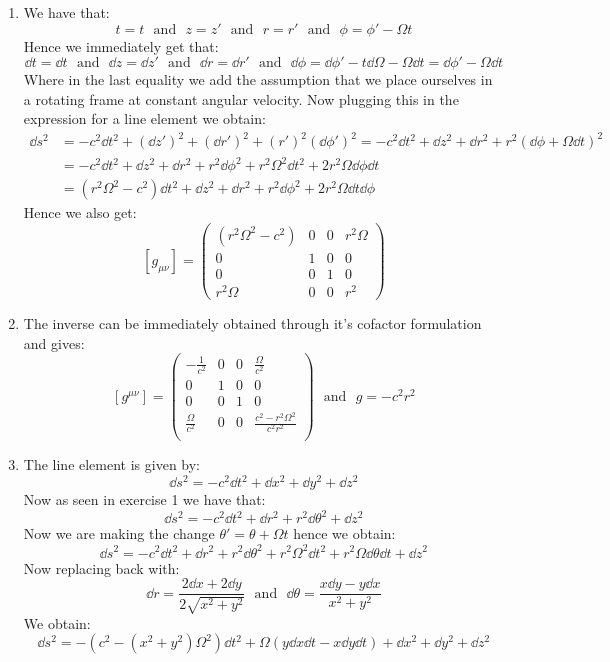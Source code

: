 \documentclass[10pt,a4paper]{article}
\begin{document}
\begin{enumerate}

\item We have that:
\[
t = t \mbox{~~and~~} z = z' \mbox{~~and~~} r = r' \mbox{~~and~~} \phi = \phi' - \Omega t
\]
Hence we immediately get that:
\[
\dd t = \dd t \mbox{~~and~~} \dd z = \dd z' \mbox{~~and~~} \dd r = \dd r' \mbox{~~and~~} \dd \phi = \dd \phi' - t \dd \Omega  - \Omega \dd t = \dd \phi' - \Omega \dd t
\]
Where in the last equality we add the assumption that we place ourselves in a rotating frame at constant angular velocity. Now plugging this in the expression for a line element we obtain:
\begin{align*}
\dd s^2 &= -c^2 \dd t^2 + (\dd z')^2 + (\dd r')^2 + (r')^2 (\dd \phi')^2 = - c^2 \dd t^2 + \dd z^2 + \dd r^2 + r^2 (\dd \phi + \Omega \dd t)^2\\
&= - c^2 \dd t^2 + \dd z^2 + \dd r^2 + r^2 \dd \phi^2 + r^2 \Omega^2 \dd t^2 + 2 r^2 \Omega \dd \phi \dd t\\
&= (r^2 \Omega^2 - c^2) \dd t^2 + \dd z^2 + \dd r^2 + r^2 \dd \phi^2 + 2r^2 \Omega \dd t \dd \phi
\end{align*}
Hence we also get:
\[
[g_{\mu \nu}] = \begin{pmatrix}
(r^2 \Omega^2 - c^2) & 0 & 0 & r^2 \Omega\\
0 & 1 & 0 & 0\\
0 & 0 & 1 & 0\\
r^2 \Omega & 0 & 0 & r^2
\end{pmatrix}
\]

\item The inverse can be immediately obtained through it's cofactor formulation and gives:
\[
[g^{\mu\nu}] = \left(
\begin{array}{cccc}
 -\frac{1}{c^2} & 0 & 0 & \frac{\Omega }{c^2} \\
 0 & 1 & 0 & 0 \\
 0 & 0 & 1 & 0 \\
 \frac{\Omega }{c^2} & 0 & 0 & \frac{c^2 - r^2 \Omega ^2}{c^2 r^2} \\
\end{array}
\right) \mbox{~~and~~} g = -c^2 r^2 
\]

\item The line element is given by:
\[
\dd s^2 = - c^2 \dd t^2 + \dd x^2 + \dd y^2 + \dd z^2 
\]
Now as seen in exercise 1 we have that:
\[
\dd s^2 = - c^2 \dd t^2 + \dd r^2 + r^2 \dd \theta^2 + \dd z^2 
\]
Now we are making the change $\theta' = \theta + \Omega t$ hence we obtain:
\[
\dd s^2 = - c^2 \dd t^2 + \dd r^2 + r^2 \dd \theta^2 + r^2 \Omega^2 \dd t^2 + r^2 \Omega \dd \theta \dd t + \dd z^2 
\]
Now replacing back with:
\[
\dd r = \frac{2 \dd x + 2 \dd y}{2\sqrt{x^2 + y^2}} \mbox{~~and~~} \dd \theta = \frac{x\dd y - y \dd x}{x^2 + y^2}
\]
We obtain:
\[
\dd s^2 = -(c^2 - (x^2 + y^2)\Omega^2)\dd t^2 +  \Omega(y \dd x \dd t - x \dd y \dd t) + \dd x^2 + \dd y^2 + \dd z^2
\]


\end{enumerate}
\end{document}
